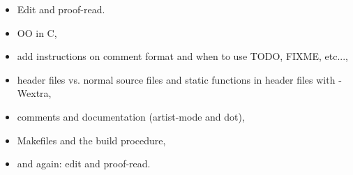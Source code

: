 \documentclass[11pt,onecolumn]{article}
\newcommand{\head}[1]{\vspace{0.4em}\noindent{\bf #1}}
\begin{document}
\head{TODO}
\begin{itemize}[itemsep=0pt,topsep=1pt,parsep=1pt,leftmargin=2.5em]
\item Edit and proof-read.
\item OO in C,
\item add instructions on comment format and when to use TODO, FIXME,
  etc..., 
\item header files vs. normal source files and static functions in
  header files with -Wextra,
\item comments and documentation (artist-mode and dot), 
\item Makefiles and the build procedure, 
\item and again: edit and proof-read.
\end{itemize}
\end{document}
